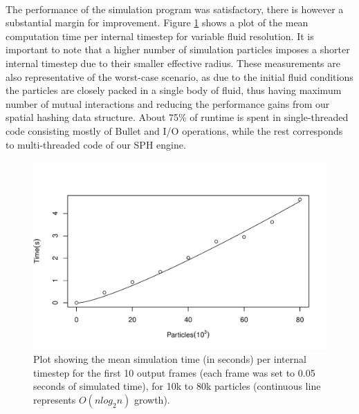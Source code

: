 \documentclass{llncs}
\begin{document}
\paragraph{} The performance of the simulation program was satisfactory, there is however
a substantial margin for improvement. Figure \ref{fig:performance} shows a plot of the
mean computation time per internal timestep for variable fluid resolution. It is important
to note that a higher number of simulation particles imposes a shorter internal timestep
due to their smaller effective radius. These measurements are also representative of the
worst-case scenario, as due to the initial fluid conditions the particles are closely
packed in a single body of fluid, thus having maximum number of mutual interactions and
reducing the performance gains from our spatial hashing data structure. About 75\% of
runtime is spent in single-threaded code consisting mostly of Bullet and I/O operations,
while the rest corresponds to multi-threaded code of our SPH engine.

\begin{figure}
  \includegraphics[width=\textwidth]{figures/performance.pdf}
  \caption{Plot showing the mean simulation time (in seconds) per internal timestep for
    the first 10 output frames (each frame was set to 0.05 seconds of simulated time), for
    10k to 80k particles (continuous line represents $O(n log_2n)$ growth).}
  \label{fig:performance}
\end{figure}
\end{document}
